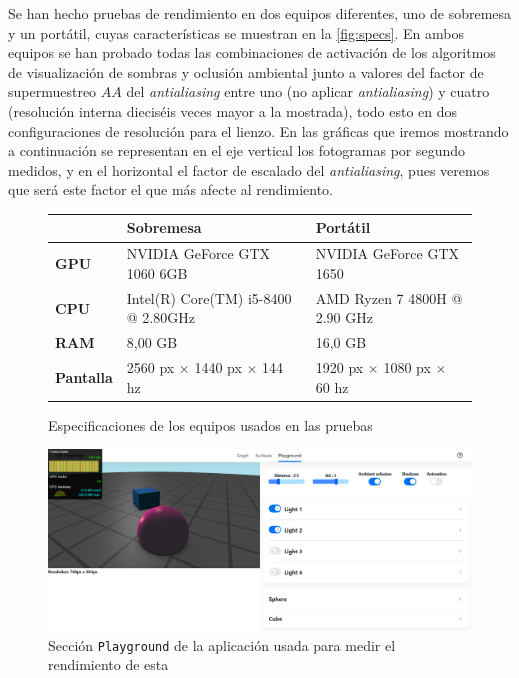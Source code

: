 Se han hecho pruebas de rendimiento en dos equipos diferentes, uno de sobremesa y un portátil, cuyas características se muestran en la \autoref{fig:specs}. En ambos equipos se han probado todas las combinaciones de activación de los algoritmos de visualización de sombras y oclusión ambiental junto a valores del factor de supermuestreo $AA$ del \textit{antialiasing} entre uno (no aplicar \textit{antialiasing}) y cuatro (resolución interna dieciséis veces mayor a la mostrada), todo esto en dos configuraciones de resolución para el lienzo. En las gráficas que iremos mostrando a continuación se representan en el eje vertical los fotogramas por segundo medidos, y en el horizontal el factor de escalado del \textit{antialiasing}, pues veremos que será este factor el que más afecte al rendimiento.\newline
\begin{figure}[hb!]
    \centering
    \begin{table}[H]
\begin{tabular}{l|l|l|}
\cline{2-3}
                                        & \textbf{Sobremesa}                      & \textbf{Portátil}                               \\ \hline
\multicolumn{1}{|l|}{\textbf{GPU}}      & NVIDIA GeForce GTX 1060 6GB             & NVIDIA GeForce GTX 1650                         \\ \hline
\multicolumn{1}{|l|}{\textbf{CPU}}      & Intel(R) Core(TM) i5-8400 @ 2.80GHz & AMD Ryzen 7 4800H @ 2.90 GHz \\ \hline
\multicolumn{1}{|l|}{\textbf{RAM}}      & 8,00 GB                                 & 16,0 GB                                         \\ \hline
\multicolumn{1}{|l|}{\textbf{Pantalla}} & 2560 px $\times$ 1440 px $\times$ 144 hz               & 1920 px  $\times$ 1080 px  $\times$ 60 hz                                  \\ \hline
\end{tabular}
\end{table}
    \caption{Especificaciones de los equipos usados en las pruebas}
    \label{fig:specs}
\end{figure}

\begin{figure}[ht!]
    \centering
    \includegraphics[width=\textwidth]{Plantilla-TFG-master/img/playground.png}
    \caption{Sección \texttt{Playground} de la aplicación usada para medir el rendimiento de esta}
\end{figure}



